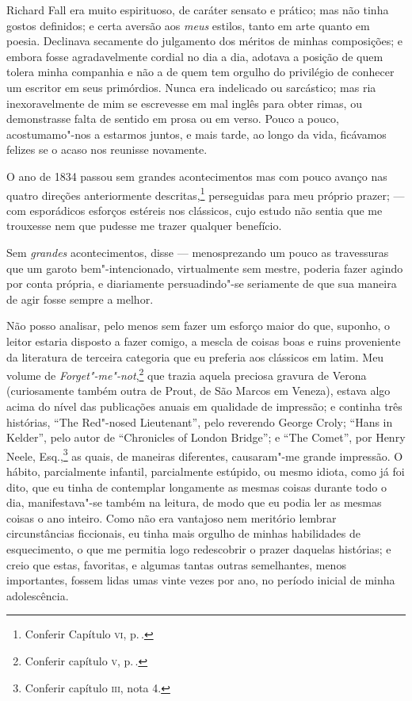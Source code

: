 Richard Fall era muito espirituoso, de caráter sensato e prático; mas
não tinha gostos definidos; e certa aversão aos \textit{meus} estilos,
tanto em arte quanto em poesia. Declinava secamente do julgamento dos
méritos de minhas composições; e embora fosse agradavelmente cordial no
dia a dia, adotava a posição de quem tolera minha companhia e não a de
quem tem orgulho do privilégio de conhecer um escritor em seus
primórdios. Nunca era indelicado ou sarcástico; mas ria inexoravelmente
de mim se escrevesse em mal inglês para obter rimas, ou demonstrasse
falta de sentido em prosa ou em verso. Pouco a pouco, acostumamo"-nos a
estarmos juntos, e mais tarde, ao longo da vida, ficávamos felizes se o
acaso nos reunisse novamente.

O ano de 1834 passou sem grandes acontecimentos mas com pouco
avanço nas quatro direções anteriormente descritas,\footnote{Conferir
  Capítulo \textsc{vi}, p.\,\pageref{139}.} perseguidas para meu próprio
prazer; --- com esporádicos esforços estéreis nos clássicos, cujo estudo
não sentia que me trouxesse nem que pudesse me trazer qualquer
benefício.

Sem \textit{grandes} acontecimentos, disse --- menosprezando um pouco as
travessuras que um garoto bem"-intencionado, virtualmente sem mestre,
poderia fazer agindo por conta própria, e diariamente persuadindo"-se
seriamente de que sua maneira de agir fosse sempre a melhor.

Não posso analisar, pelo menos sem fazer um esforço maior do que,
suponho, o leitor estaria disposto a fazer comigo, a mescla de coisas
boas e ruins proveniente da literatura de terceira categoria que eu
preferia aos clássicos em latim. Meu volume de
\textit{Forget"-me"-not},\footnote{Conferir capítulo \textsc{v}, p.\,\pageref{102}.}
que trazia aquela preciosa gravura de Verona (curiosamente também outra
de Prout, de São Marcos em Veneza), estava algo acima do nível das
publicações anuais em qualidade de impressão; e continha três histórias,
``The Red"-nosed Lieutenant'', pelo reverendo George Croly; ``Hans in
Kelder'', pelo autor de ``Chronicles of London Bridge''; e ``The
Comet'', por Henry Neele, Esq.,\footnote{Conferir capítulo \textsc{iii}, nota 4.} %
 as quais, de maneiras diferentes, causaram"-me grande
impressão. O hábito, parcialmente infantil, parcialmente estúpido, ou
mesmo idiota, como já foi dito, que eu tinha de contemplar longamente as
mesmas coisas durante todo o dia, manifestava"-se também na leitura, de
modo que eu podia ler as mesmas coisas o ano inteiro. Como não era
vantajoso nem meritório lembrar circunstâncias ficcionais, eu tinha mais
orgulho de minhas habilidades de esquecimento, o que me permitia logo
redescobrir o prazer daquelas histórias; e creio que estas, favoritas, e
algumas tantas outras semelhantes, menos importantes, fossem lidas umas
vinte vezes por ano, no período inicial de minha adolescência.

